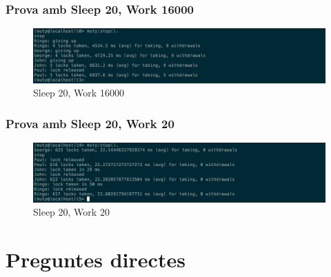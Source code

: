 \documentclass[a4paper, 11pt]{article}
\begin{document}
\subsubsection{Prova amb Sleep 20, Work 16000}

\begin{figure}[H]
    \centering
    \includegraphics[width=1.0\textwidth]{figures/20-16000lock3}
    \caption{Sleep 20, Work 16000 \label{fig:20-16000lock3}}    
\end{figure}

\subsubsection{Prova amb Sleep 20, Work 20}

\begin{figure}[H]
    \centering
    \includegraphics[width=1.0\textwidth]{figures/20-20lock3}
    \caption{Sleep 20, Work 20 \label{fig:20-20lock3}}    
\end{figure}

\section{Preguntes directes}
\end{document}
